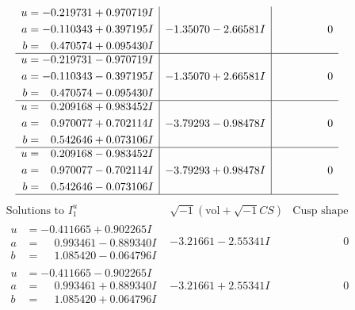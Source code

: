 \documentclass[1p]{elsarticle_modified}
\theoremstyle{definition}
\newcommand{\I}{\sqrt{-1}}
\begin{document}
$$\begin{array}{c|c|c}
\begin{aligned}
u &= -0.219731 + 0.970719 I \\
a &= -0.110343 + 0.397195 I \\
b &= \phantom{-}0.470574 + 0.095430 I\end{aligned}
 & -1.35070 - 2.66581 I & \phantom{-0.000000 } 0 \\ \hline\begin{aligned}
u &= -0.219731 - 0.970719 I \\
a &= -0.110343 - 0.397195 I \\
b &= \phantom{-}0.470574 - 0.095430 I\end{aligned}
 & -1.35070 + 2.66581 I & \phantom{-0.000000 } 0 \\ \hline\begin{aligned}
u &= \phantom{-}0.209168 + 0.983452 I \\
a &= \phantom{-}0.970077 + 0.702114 I \\
b &= \phantom{-}0.542646 + 0.073106 I\end{aligned}
 & -3.79293 - 0.98478 I & \phantom{-0.000000 } 0 \\ \hline\begin{aligned}
u &= \phantom{-}0.209168 - 0.983452 I \\
a &= \phantom{-}0.970077 - 0.702114 I \\
b &= \phantom{-}0.542646 - 0.073106 I\end{aligned}
 & -3.79293 + 0.98478 I & \phantom{-0.000000 } 0\\
 \hline 
 \end{array}$$\newpage$$\begin{array}{c|c|c}  
\text{Solutions to }I^u_{1}& \I (\text{vol} + \sqrt{-1}CS) & \text{Cusp shape}\\
 \hline 
\begin{aligned}
u &= -0.411665 + 0.902265 I \\
a &= \phantom{-}0.993461 - 0.889340 I \\
b &= \phantom{-}1.085420 - 0.064796 I\end{aligned}
 & -3.21661 - 2.55341 I & \phantom{-0.000000 } 0 \\ \hline\begin{aligned}
u &= -0.411665 - 0.902265 I \\
a &= \phantom{-}0.993461 + 0.889340 I \\
b &= \phantom{-}1.085420 + 0.064796 I\end{aligned}
 & -3.21661 + 2.55341 I & \phantom{-0.000000 } 0 \\ \hline\begin{aligned}

\end{aligned}
\end{array}$$
\end{document}

